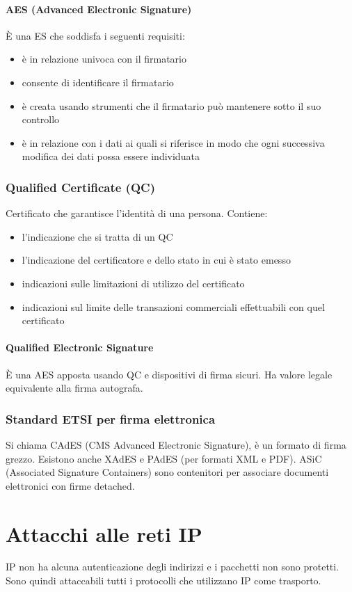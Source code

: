 \documentclass[11pt]{article}
\begin{document}
\paragraph*{AES (Advanced Electronic Signature)}
È una ES che soddisfa i seguenti requisiti:
\begin{itemize}
    \item è in relazione univoca con il firmatario
    \item consente di identificare il firmatario 
    \item è creata usando strumenti che il firmatario può mantenere sotto il suo controllo 
    \item è in relazione con i dati ai quali si riferisce in modo che ogni successiva modifica dei dati possa essere individuata 
\end{itemize}
\subsubsection{Qualified Certificate (QC)}
Certificato che garantisce l'identità di una persona. Contiene:
\begin{itemize}
    \item l'indicazione che si tratta di un QC 
    \item l'indicazione del certificatore e dello stato in cui è stato emesso 
    \item indicazioni sulle limitazioni di utilizzo del certificato 
    \item indicazioni sul limite delle transazioni commerciali effettuabili con quel certificato 
\end{itemize}
\paragraph*{Qualified Electronic Signature}
È una AES apposta usando QC e dispositivi di firma sicuri. Ha valore legale equivalente alla firma autografa. 
\subsubsection{Standard ETSI per firma elettronica}
Si chiama CAdES (CMS Advanced Electronic Signature), è un formato di firma grezzo. Esistono anche XAdES e PAdES (per formati XML e PDF).
ASiC (Associated Signature Containers) sono contenitori per associare documenti elettronici con firme detached.
\section{Attacchi alle reti IP}
IP non ha alcuna autenticazione degli indirizzi e i pacchetti non sono protetti. Sono quindi attaccabili tutti i protocolli 
che utilizzano IP come trasporto.
\end{document}
